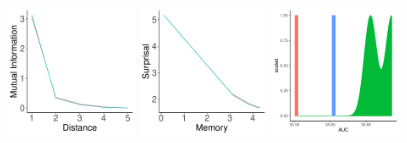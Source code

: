 \documentclass[11pt,letterpaper]{article}
\begin{document}
\begin{figure}
	\begin{center}
\includegraphics[width=0.3\textwidth]{figures/Sesotho-suffixes-byMorphemes-it.pdf}
\includegraphics[width=0.3\textwidth]{figures/Sesotho-suffixes-byMorphemes-memsurp.pdf}
\includegraphics[width=0.3\textwidth]{figures/Sesotho-suffixes-byMorphemes-auc-hist.pdf}


\end{center}
\end{figure}
\end{document}
